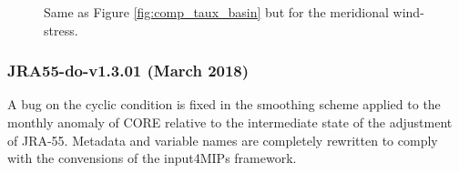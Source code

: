 \documentclass[dvipdfmx]{elsarticle_mod}
\begin{document}
\begin{figure}[h]
  \centering
  \caption{Same as Figure \ref{fig:comp_taux_basin} but for the meridional wind-stress.}
  \label{fig:comp_tauy_basin}
\end{figure}



\subsubsection{JRA55-do-v1.3.01 (March 2018)}
\label{app:version_1_3_1}

A bug on the cyclic condition is fixed in the smoothing scheme applied to the monthly anomaly of CORE relative to the intermediate state of the adjustment of JRA-55. Metadata and variable names are completely rewritten to comply with the convensions of the input4MIPs framework.
\end{document}
